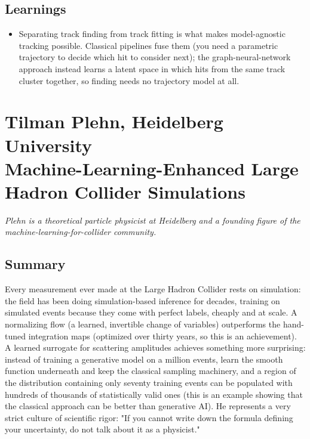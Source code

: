 \documentclass[11pt]{article}
\begin{document}
\subsection*{Learnings}
\begin{itemize}
    \item Separating track finding from track fitting is what makes model-agnostic tracking possible. Classical pipelines fuse them (you need a parametric trajectory to decide which hit to consider next); the graph-neural-network approach instead learns a latent space in which hits from the same track cluster together, so finding needs no trajectory model at all. %
\end{itemize}

\section{Tilman Plehn, Heidelberg University\\
{\large Machine-Learning-Enhanced Large Hadron Collider Simulations}}

\emph{Plehn is a theoretical particle physicist at Heidelberg and a founding figure of the machine-learning-for-collider community.}

\subsection*{Summary}
Every measurement ever made at the Large Hadron Collider rests on simulation: the field has been doing simulation-based inference for decades, training on simulated events because they come with perfect labels, cheaply and at scale. A normalizing flow (a learned, invertible change of variables) outperforms the hand-tuned integration maps (optimized over thirty years, so this is an achievement). A learned surrogate for scattering amplitudes achieves something more surprising: instead of training a generative model on a million events, learn the smooth function underneath and keep the classical sampling machinery, and a region of the distribution containing only seventy training events can be populated with hundreds of thousands of statistically valid ones (this is an example showing that the classical approach can be better than generative AI). He represents a very strict culture of scientific rigor: "If you cannot write down the formula defining your uncertainty, do not talk about it as a physicist."
\end{document}
